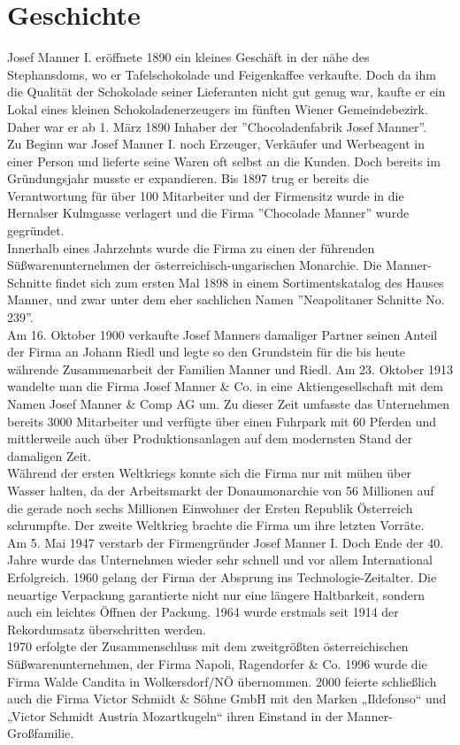 \section{Geschichte}
Josef Manner I. eröffnete 1890 ein kleines Geschäft in der nähe des Stephansdoms, wo er Tafelschokolade und Feigenkaffee verkaufte. Doch da ihm die Qualität der Schokolade seiner Lieferanten nicht gut genug war, kaufte er ein Lokal eines kleinen Schokoladenerzeugers im fünften Wiener Gemeindebezirk. Daher war er ab 1. März 1890 Inhaber der ''Chocoladenfabrik Josef Manner''. \\
Zu Beginn war Josef Manner I. noch Erzeuger, Verkäufer und Werbeagent in einer Person und lieferte seine Waren oft selbst an die Kunden. Doch bereits im Gründungsjahr musste er expandieren. Bis 1897 trug er bereits die Verantwortung für über 100 Mitarbeiter und der Firmensitz wurde in die Hernalser Kulmgasse verlagert und die Firma ''Chocolade Manner'' wurde gegründet.\\
Innerhalb eines Jahrzehnts wurde die Firma zu einen der führenden Süßwarenunternehmen der österreichisch-ungarischen Monarchie. 
Die Manner-Schnitte findet sich zum ersten Mal 1898 in einem Sortimentskatalog des Hauses Manner, und zwar unter dem eher sachlichen Namen ''Neapolitaner Schnitte No. 239''. \\
Am 16. Oktober 1900 verkaufte Josef Manners damaliger Partner seinen Anteil der Firma an Johann Riedl  und legte so den Grundstein für die bis heute währende Zusammenarbeit der Familien Manner und Riedl.
Am 23. Oktober 1913 wandelte man die Firma Josef Manner \& Co. in eine Aktiengesellschaft mit dem Namen Josef Manner \& Comp AG um. Zu dieser Zeit umfasste das Unternehmen bereits 3000 Mitarbeiter und verfügte über einen Fuhrpark mit 60 Pferden und mittlerweile auch über Produktionsanlagen auf dem modernsten Stand der damaligen Zeit. \\
Während der ersten Weltkriegs konnte sich die Firma nur mit mühen über Wasser halten, da der Arbeitsmarkt der Donaumonarchie von 56 Millionen auf die gerade noch sechs Millionen Einwohner der Ersten Republik Österreich schrumpfte. Der zweite Weltkrieg brachte die Firma um ihre letzten Vorräte.\\
Am 5. Mai 1947 verstarb der Firmengründer Josef Manner I. Doch Ende der 40. Jahre wurde das Unternehmen wieder sehr schnell und vor allem International Erfolgreich. 1960 gelang der Firma der Absprung ins Technologie-Zeitalter. Die neuartige Verpackung garantierte nicht nur eine längere Haltbarkeit, sondern auch ein leichtes Öffnen der Packung. 1964 wurde erstmals seit 1914 der Rekordumsatz überschritten werden.\\
1970 erfolgte der Zusammenschluss mit dem zweitgrößten österreichischen Süßwarenunternehmen, der Firma Napoli, Ragendorfer \& Co. 1996 wurde die Firma Walde Candita in Wolkersdorf/NÖ übernommen. 2000 feierte schließlich auch die Firma Victor Schmidt \& Söhne GmbH mit den Marken „Ildefonso“ und „Victor Schmidt Austria Mozartkugeln“ ihren Einstand in der Manner-Großfamilie. \cite{josef_manner_unternehmen}